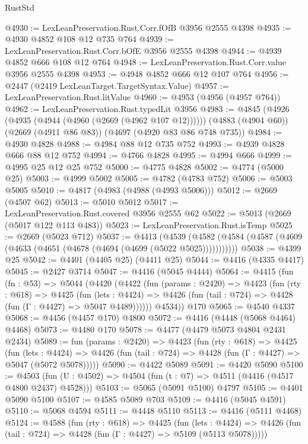\begin{lexlean}{RustStd}
\begin{coremodule}
@4930 := LexLeanPreservation.Rust.Corr.fOfB @3956 @2555 @4398
@4935 := @4930 @4852 @108 @12 @735 @764
@4939 := LexLeanPreservation.Rust.Corr.bOfE @3956 @2555 @4398
@4944 := @4939 @4852 @666 @108 @12 @764
@4948 := LexLeanPreservation.Rust.Corr.value @3956 @2555 @4398
@4953 := @4948 @4852 @666 @12 @107 @764
@4956 := @2447 (@2419 LexLeanTarget.TargetSyntax.Value)
@4957 := LexLeanPreservation.Rust.litValue
@4960 := @4953 (@4956 (@4957 @764))
@4962 := LexLeanPreservation.Rust.typedLit @3956
@4983 := @4845
    (@4926 (@4935 (@4944 (@4960 (@2669 (@4962 @107 @12))))))
    (@4883 (@4904 @60))
    (@2669 (@4911 @86 @83))
    (@4697 (@4920 @83 @86 @748 @735))
@4984 := @4930 @4828
@4988 := @4984 @88 @12 @735 @752
@4993 := @4939 @4828 @666 @88 @12 @752
@4994 := @4766 @4828
@4995 := @4994 @666
@4999 := @4995 @25 @12 @25 @752
@5000 := @4775 @4828
@5002 := @4774 (@5000 @25)
@5003 := @4999 @5002
@5005 := @4782 (@4783 @752)
@5006 := @5003 @5005
@5010 := @4817 (@4983 (@4988 (@4993 @5006)))
@5012 := @2669 (@4507 @62)
@5013 := @5010 @5012
@5017 := LexLeanPreservation.Rust.covered @3956 @2555 @62
@5022 := @5013 (@2669 (@5017 @122 @113 @483))
@5023 := LexLeanPreservation.Rust.isTemp
@5025 := @2669 (@5023 @712)
@5037 := @4413
    (@4539 (@4582 (@4584 (@4587 (@4609 (@4633 (@4651 (@4678 (@4694 (@4699 (@5022 @5025)))))))))))
@5038 := @4399 @25
@5042 := @4401 (@4405 @25) (@4411 @25)
@5044 := @4416 (@4335 @4417)
@5045 := @2427 @3714
@5047 := @4416 (@5045 @4444)
@5064 := @4415
    (fun (fn : @53) =>
    @5044
      (@4420
        (@4422
          (fun (params : @2420) =>
          @4423
            (fun (rty : @618) =>
            @4425
              (fun (lets : @4424) =>
              @4426 (fun (tail : @724) => @4428 (fun (Γ : @4427) => @5047 @4489))))))
        @4534))
    @170
@5065 := @4540 @4337
@5068 := @4456 (@4457 @170) @4800
@5072 := @4416 (@4448 (@5068 @4464) @4468)
@5073 := @4480 @170
@5078 := @4477 (@4479 @5073 @4804 @2431 @2434)
@5089 := fun (params : @2420) =>
  @4423
    (fun (rty : @618) =>
    @4425
      (fun (lets : @4424) =>
      @4426 (fun (tail : @724) => @4428 (fun (Γ : @4427) => @5047 (@5072 @5078)))))
@5090 := @4422 @5089
@5091 := @4420 @5090
@5100 := @4503 (fun (U : @4502) => @4504 (fun (t : @7) => @4511 (@4416 (@4517 @4800 @2437) @4528)))
@5103 := @5065 (@5091 @5100) @4797
@5105 := @4401 @5090 @5100
@5107 := @4585 @5089 @703
@5109 := @4416 (@5045 @4591)
@5110 := @5068 @4594
@5111 := @4448 @5110
@5113 := @4416 (@5111 @4468)
@5124 := @4588
    (fun (rty : @618) =>
    @4425
      (fun (lets : @4424) =>
      @4426 (fun (tail : @724) => @4428 (fun (Γ : @4427) => @5109 (@5113 @5078)))))

\end{coremodule}
\end{lexlean}
